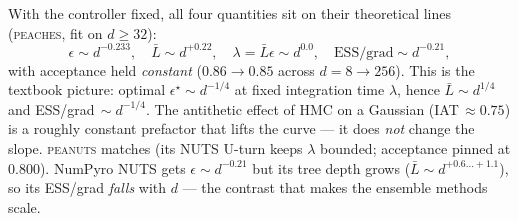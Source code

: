 \documentclass[11pt]{article}
\begin{document}
With the controller fixed, all four quantities sit on their theoretical lines
(\textsc{peaches}, fit on $d\!\ge\!32$):
\[
  \epsilon\sim d^{-0.233},\quad
  \bar L\sim d^{+0.22},\quad
  \lambda=\bar L\epsilon\sim d^{0.0},\quad
  \text{ESS}/\text{grad}\sim d^{-0.21},
\]
with acceptance held \emph{constant} ($0.86\!\to\!0.85$ across
$d{=}8\!\to\!256$). This is the textbook picture: optimal
$\epsilon^\star\!\sim\!d^{-1/4}$ at fixed integration time $\lambda$, hence
$\bar L\!\sim\!d^{1/4}$ and ESS/grad$\,\sim\!d^{-1/4}$. The antithetic effect
of HMC on a Gaussian (IAT$\,\approx\!0.75$) is a roughly constant prefactor
that lifts the curve --- it does \emph{not} change the slope. \textsc{peanuts}
matches (its NUTS U-turn keeps $\lambda$ bounded; acceptance pinned at
$0.800$). NumPyro NUTS gets $\epsilon\!\sim\!d^{-0.21}$ but its tree depth
grows ($\bar L\!\sim\!d^{+0.6\ldots+1.1}$), so its ESS/grad \emph{falls} with
$d$ --- the contrast that makes the ensemble methods scale.
\end{document}
